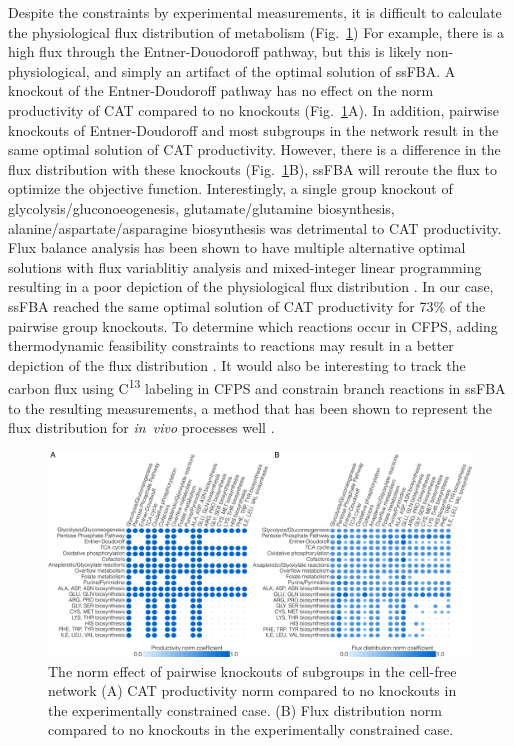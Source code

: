 \documentclass[journal=asbcd6,manuscript=article]{achemso}
\begin{document}
Despite the constraints by experimental measurements, it is difficult to calculate the physiological flux distribution of metabolism (Fig.~\ref{fig:norm})
For example, there is a high flux through the Entner-Douodoroff pathway, but this is likely non-physiological, and simply an artifact of the optimal solution of ssFBA.
A knockout of the Entner-Doudoroff pathway has no effect on the norm productivity of CAT compared to no knockouts (Fig.~\ref{fig:norm}A).
In addition, pairwise knockouts of Entner-Doudoroff and most subgroups in the network result in the same optimal solution of CAT productivity.
However, there is a difference in the flux distribution with these knockouts (Fig.~\ref{fig:norm}B), ssFBA will reroute the flux to optimize the objective function.
Interestingly, a single group knockout of glycolysis/gluconoeogenesis, glutamate/glutamine biosynthesis, alanine/aspartate/asparagine biosynthesis was detrimental to CAT productivity.
Flux balance analysis has been shown to have multiple alternative optimal solutions with flux variablitiy analysis and mixed-integer linear programming resulting in a poor depiction of the physiological flux distribution \cite{LEE2000711, Mahadevan2003264, Schuetz119}.
In our case, ssFBA reached the same optimal solution of CAT productivity for 73\% of the pairwise group knockouts.
To determine which reactions occur in CFPS, adding thermodynamic feasibility constraints to reactions may result in a better depiction of the flux distribution \cite{Henry:2007,Hamilton:2013}.
It would also be interesting to track the carbon flux using C\textsuperscript{13} labeling in CFPS and constrain branch reactions in ssFBA to the resulting measurements, a method that has been shown to represent the flux distribution for \emph{in~vivo} processes well \cite{Zamboni:2009}.
\begin{figure}[t!]
\includegraphics[width=1.0\textwidth]{./figs/Fig-7-FluxDistribition-Analysis.pdf}
\caption{The norm effect of pairwise knockouts of subgroups in the cell-free network (A) CAT productivity norm compared to no knockouts in the experimentally constrained case. (B) Flux distribution norm compared to no knockouts in the experimentally constrained case.}
\label{fig:norm}
\end{figure}
\end{document}
